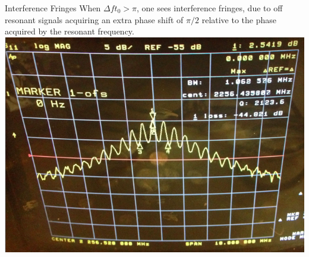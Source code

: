 \documentclass{beamer}
\begin{document}
\begin{frame}{Interference Fringes}
When $\Delta f t_0 > \pi$, one sees interference fringes, due to off resonant signals acquiring an extra phase shift of $\pi/2$ relative to the phase acquired by the resonant frequency.
\includegraphics[width=\textwidth]{s21_delay}
\end{frame}
\end{document}
